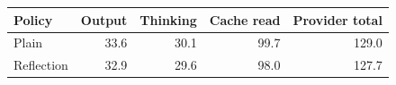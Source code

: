 \begin{tabular}{lrrrr}
\toprule
Policy & Output & Thinking & Cache read & Provider total \\
\midrule
Plain & 33.6 & 30.1 & 99.7 & 129.0 \\
Reflection & 32.9 & 29.6 & 98.0 & 127.7 \\
\bottomrule
\end{tabular}
